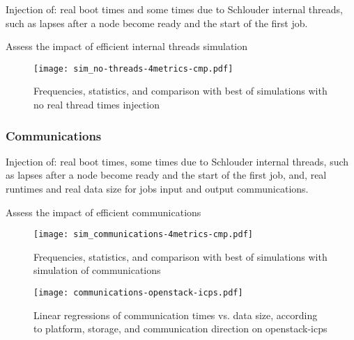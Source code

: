 {Injection of: real boot times and some times due to Schlouder internal threads, 
such as lapses after a node become ready and the start of the first job.

Assess the impact of efficient internal threads simulation

\begin{figure}
  \centering
  \texttt{[image: sim\_no-threads-4metrics-cmp.pdf]}
  
  

  

  
    
  \caption{Frequencies, statistics, and comparison with best of simulations with no real thread times
  injection}
\end{figure} 



\subsubsection{Communications}

Injection of: real boot times, some times due to Schlouder internal threads, 
such as lapses after a node become ready and the start of the first job, 
and, real runtimes and real data size for jobs input and output communications.

Assess the impact of efficient communications 

\begin{figure}
  \centering
  \texttt{[image: sim\_communications-4metrics-cmp.pdf]}
  
  

  

  

  \caption{Frequencies, statistics, and comparison with best of simulations with simulation of communications}
\end{figure} 

\begin{figure}
  \centering
  \texttt{[image: communications-openstack-icps.pdf]}
  
  \caption{Linear regressions of communication times vs. data size, 
    according to platform, storage, and communication direction on openstack-icps}
\end{figure} 


}
